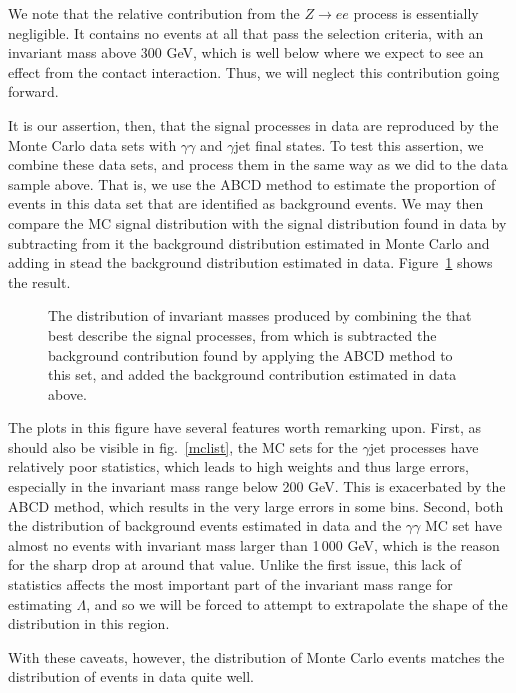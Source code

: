We note that the relative contribution from the $Z\rightarrow ee$ process is essentially negligible. It contains no events at all that pass the selection criteria, with an invariant mass above 300 GeV, which is well below where we expect to see an effect from the contact interaction. Thus, we will neglect this contribution going forward.

It is our assertion, then, that the signal processes in data are reproduced by the \atlas{} Monte Carlo data sets with $\gamma\gamma$ and $\gamma$jet final states. To test this assertion, we combine these data sets, and process them in the same way as we did to the data sample above. That is, we use the ABCD method to estimate the proportion of events in this data set that are identified as background events. We may then compare the MC signal distribution with the signal distribution found in data by subtracting from it the background distribution estimated in Monte Carlo and adding in stead the background distribution estimated in data. Figure~\ref{atlasmc} shows the result.

\begin{figure}[htp]
\begin{minipage}[b]{\textwidth}
\begin{infilsf} \tiny

\end{infilsf}
\end{minipage}

\begin{minipage}[b]{\textwidth}
\caption{The distribution of invariant masses produced by combining the \atlas{} that best describe the signal processes, from which is subtracted the background contribution found by applying the ABCD method to this set, and added the background contribution estimated in data above. }\label{atlasmc}
\end{minipage}
\end{figure}

The plots in this figure have several features worth remarking upon. First, as should also be visible in fig.~\ref{mclist}, the MC sets for the $\gamma$jet processes have relatively poor statistics, which leads to high weights and thus large errors, especially in the invariant mass range below 200 GeV. This is exacerbated by the ABCD method, which results in the very large errors in some bins. Second, both the distribution of background events estimated in data and the $\gamma\gamma$ MC set have almost no events with invariant mass larger than 1\,000 GeV, which is the reason for the sharp drop at around that value. Unlike the first issue, this lack of statistics affects the most important part of the invariant mass range for estimating $\Lambda$, and so we will be forced to attempt to extrapolate the shape of the distribution in this region.

With these caveats, however, the distribution of Monte Carlo events matches the distribution of events in data quite well.







